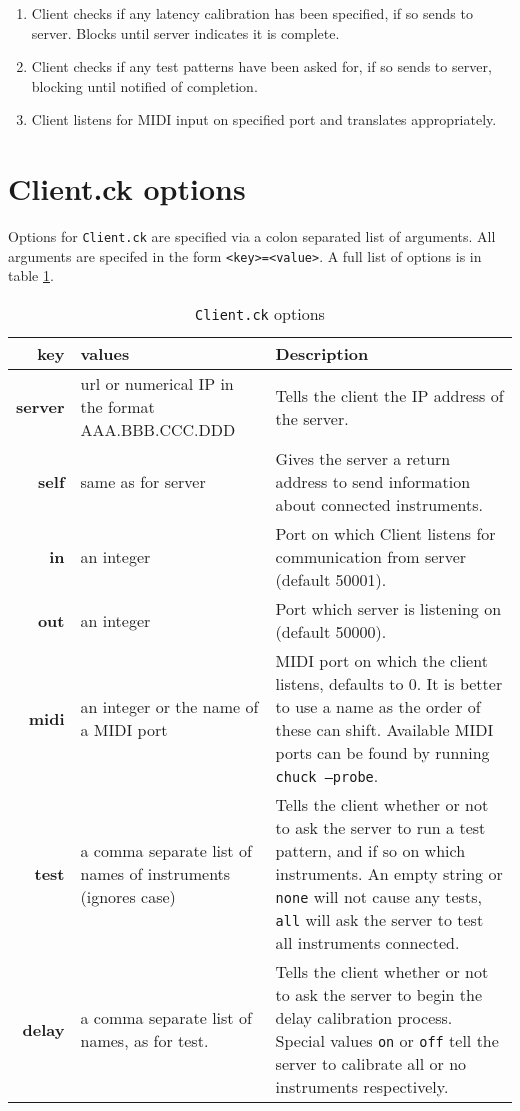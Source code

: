 \documentclass[11pt]{article}
\begin{document}
\begin{flushleft}
\begin{enumerate}[\bf1.]
\begin{enumerate} [\bf a.]
			to the console.
		\item Client checks if any latency calibration has been specified, if so sends to server. Blocks until server indicates it is complete.
		\item Client checks if any test patterns have been asked for, if so sends to server, blocking until notified of completion.
		\item Client listens for MIDI input on specified port and translates appropriately.
	 \end{enumerate}
\end{enumerate}
\end{flushleft}

\section{Client.ck options}
\label{sec:clientopts}
Options for \texttt{Client.ck} are specified via a colon separated list of arguments. All arguments are specifed in the form \texttt{<key>=<value>}. A full list of options
is in table \ref{tab:clientopts}.

\begin{table} [h]
\caption {\texttt{Client.ck} options}
\label{tab:clientopts}
\begin{tabularx} {\textwidth} { | >{\bfseries}r | X | X |}
\hline
key			& values											& Description \\
\hline \hline
server		& url or numerical IP in the format AAA.BBB.CCC.DDD & Tells the client the IP address of the server. \\
\hline
self			& same as for server							    & Gives the server a return address to send information about connected instruments. \\
\hline
in 			& an integer								    & Port on which Client listens for communication from server (default 50001). \\
\hline
out		         & an integer								    & Port which server is listening on (default 50000). \\
\hline
midi			& an integer or the name of a MIDI port			    & MIDI port on which the client listens, defaults to 0. It is better to use a name as the order
														of these can shift. Available MIDI ports can be found by running \texttt{chuck --probe}. \\
\hline
test			& a comma separate list of names of instruments (ignores case) & Tells the client whether or not to ask the server to run a test pattern, and if so on
														which instruments. An empty string or \texttt{none} will not cause any tests, \texttt{all} will
														ask the server to test all instruments connected. \\
\hline
delay		& a comma separate list of names, as for test. 		    & Tells the client whether or not to ask the server to begin the delay calibration process. 
														Special values \texttt{on} or \texttt{off} tell the server to calibrate all or no instruments
														respectively. \\
\hline
\end{tabularx}

\end{table}
\end{document}
